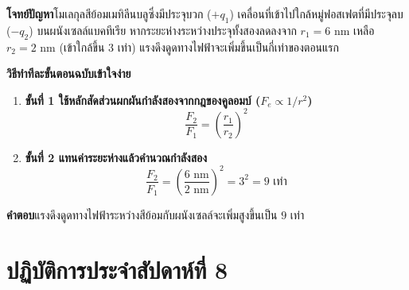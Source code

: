 \begin{worked}
\textbf{โจทย์ปัญหา}\quad โมเลกุลสีย้อมเมทิลีนบลูซึ่งมีประจุบวก ($+q_1$) เคลื่อนที่เข้าไปใกล้หมู่ฟอสเฟตที่มีประจุลบ ($-q_2$) บนผนังเซลล์แบคทีเรีย หากระยะห่างระหว่างประจุทั้งสองลดลงจาก $r_1 = 6\text{ nm}$ เหลือ $r_2 = 2\text{ nm}$ (เข้าใกล้ขึ้น $3$ เท่า) แรงดึงดูดทางไฟฟ้าจะเพิ่มขึ้นเป็นกี่เท่าของตอนแรก

\textbf{วิธีทำทีละขั้นตอนฉบับเข้าใจง่าย}
\begin{enumerate}
    \item \textbf{ขั้นที่ 1 ใช้หลักสัดส่วนผกผันกำลังสองจากกฎของคูลอมบ์ ($F_e \propto 1/r^2$)}
    \[
        \frac{F_2}{F_1} = \left(\frac{r_1}{r_2}\right)^2
    \]
    \item \textbf{ขั้นที่ 2 แทนค่าระยะห่างแล้วคำนวณกำลังสอง}
    \[
        \frac{F_2}{F_1} = \left(\frac{6\text{ nm}}{2\text{ nm}}\right)^2 = 3^2 = 9\text{ เท่า}
    \]
\end{enumerate}
\textbf{คำตอบ}\quad แรงดึงดูดทางไฟฟ้าระหว่างสีย้อมกับผนังเซลล์จะเพิ่มสูงขึ้นเป็น $9$ เท่า
\end{worked}

\section{ปฏิบัติการประจำสัปดาห์ที่ 8}

